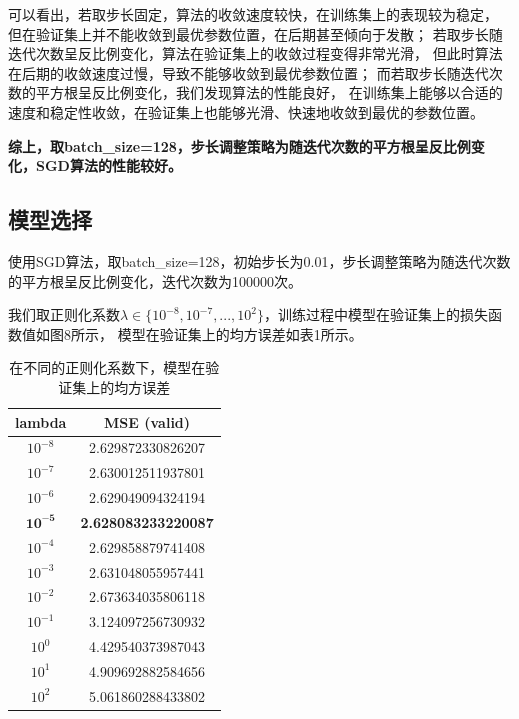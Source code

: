 \documentclass[12pt, a4paper]{article}
\begin{document}
        可以看出，若取步长固定，算法的收敛速度较快，在训练集上的表现较为稳定，
        但在验证集上并不能收敛到最优参数位置，在后期甚至倾向于发散；
        若取步长随迭代次数呈反比例变化，算法在验证集上的收敛过程变得非常光滑，
        但此时算法在后期的收敛速度过慢，导致不能够收敛到最优参数位置；
        而若取步长随迭代次数的平方根呈反比例变化，我们发现算法的性能良好，
        在训练集上能够以合适的速度和稳定性收敛，在验证集上也能够光滑、快速地收敛到最优的参数位置。

        \textbf{综上，取batch\_size=128，步长调整策略为随迭代次数的平方根呈反比例变化，SGD算法的性能较好。}

    \subsection{模型选择}

    使用SGD算法，取batch\_size=128，初始步长为0.01，步长调整策略为随迭代次数的平方根呈反比例变化，迭代次数为100000次。

    我们取正则化系数$\lambda \in \{10^{-8}, 10^{-7}, ..., 10^{2}\}$，训练过程中模型在验证集上的损失函数值如图8所示，
    模型在验证集上的均方误差如表1所示。

    \begin{table}[htbp]
    \caption{在不同的正则化系数下，模型在验证集上的均方误差}
    \centering
    \begin{tabular}{cc}
        \toprule
        lambda         & MSE (valid)                \\
        \midrule
        $10^{-8}$      & 2.629872330826207          \\
        $10^{-7}$      & 2.630012511937801          \\
        $10^{-6}$      & 2.629049094324194          \\
        $\bm{10^{-5}}$ & \textbf{2.628083233220087} \\
        $10^{-4}$      & 2.629858879741408          \\
        $10^{-3}$      & 2.631048055957441          \\
        $10^{-2}$      & 2.673634035806118          \\
        $10^{-1}$      & 3.124097256730932          \\
        $10^0$         & 4.429540373987043          \\
        $10^1$         & 4.909692882584656          \\
        $10^2$         & 5.061860288433802
    \end{tabular}
    \end{table}
\end{document}
